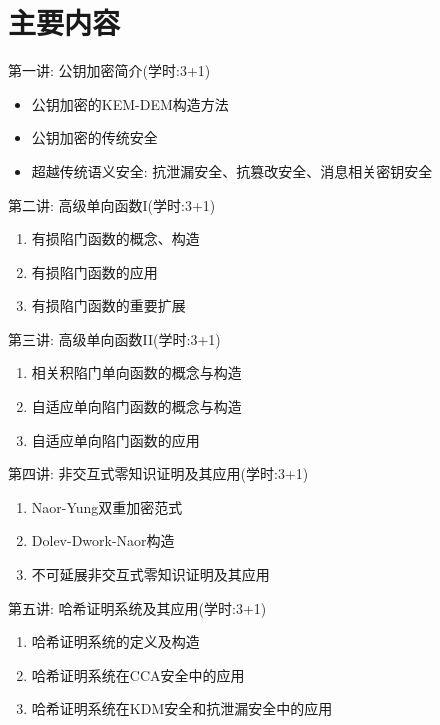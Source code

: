 \documentclass[a4paper,12pt]{ctexart}
\begin{document}
\section*{主要内容}
\begin{trivlist}
\item 第一讲: 公钥加密简介(学时:3+1) ~\cite{NS-CRYPTO-2009,DFMV-ASIACRYPT-2013,Wee-PKC-2016}
\begin{itemize}
    \item 公钥加密的KEM-DEM构造方法 
    \item 公钥加密的传统安全
    \item 超越传统语义安全: 抗泄漏安全、抗篡改安全、消息相关密钥安全
\end{itemize}


\item 第二讲: 高级单向函数I(学时:3+1) ~\cite{PW-STOC-2008,Chen-CT-RSA-2018}
\begin{enumerate}
    \item 有损陷门函数的概念、构造
    \item 有损陷门函数的应用
    \item 有损陷门函数的重要扩展
\end{enumerate}

\item 第三讲: 高级单向函数II(学时:3+1) ~\cite{RS-TCC-2009,KMO-EUROCRYPT-2010}
\begin{enumerate}
    \item 相关积陷门单向函数的概念与构造
    \item 自适应单向陷门函数的概念与构造
    \item 自适应单向陷门函数的应用
\end{enumerate}

\item 第四讲: 非交互式零知识证明及其应用(学时:3+1) ~\cite{NY-STOC-1990,DDN-STOC-1991,Sahai-FOCS-1999}
\begin{enumerate}
    \item Naor-Yung双重加密范式
    \item Dolev-Dwork-Naor构造
    \item 不可延展非交互式零知识证明及其应用
\end{enumerate}

\item 第五讲: 哈希证明系统及其应用(学时:3+1) ~\cite{CS-EUROCRYPT-2002,QL-ASIACRYPT-2013,Wee-PKC-2016}
\begin{enumerate}
    \item 哈希证明系统的定义及构造
    \item 哈希证明系统在CCA安全中的应用
    \item 哈希证明系统在KDM安全和抗泄漏安全中的应用
\end{enumerate}


\end{trivlist}
\end{document}
